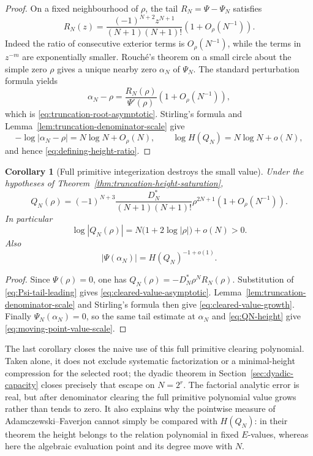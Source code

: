 \documentclass[11pt]{article}
\newtheorem{corollary}[theorem]{Corollary}
\theoremstyle{definition}
\theoremstyle{remark}
\begin{document}
\begin{proof}
On a fixed neighbourhood of $\rho$, the tail
$R_N=\Psi-\Psi_N$ satisfies
\begin{equation}\label{eq:Psi-tail-leading}
 R_N(z)=
 \frac{(-1)^{N+2}z^{N+1}}{(N+1)(N+1)!}
 \left(1+O_\rho(N^{-1})\right).
\end{equation}
Indeed the ratio of consecutive exterior terms is $O_\rho(N^{-1})$, while
the terms in $z^{-m}$ are exponentially smaller.  Rouch\'e's theorem on a
small circle about the simple zero $\rho$ gives a unique nearby zero
$\alpha_N$ of $\Psi_N$.  The standard perturbation formula yields
\[
 \alpha_N-\rho
 =\frac{R_N(\rho)}{\Psi'(\rho)}
  \left(1+O_\rho(N^{-1})\right),
\]
which is \eqref{eq:truncation-root-asymptotic}.  Stirling's formula and
Lemma~\ref{lem:truncation-denominator-scale} give
\[
 -\log|\alpha_N-\rho|=N\log N+O_\rho(N),
 \qquad
 \log H(Q_N)=N\log N+o(N),
\]
and hence \eqref{eq:defining-height-ratio}.
\end{proof}

\begin{corollary}[Full primitive integerization destroys the small value]
\label{cor:integerized-truncation-growth}
Under the hypotheses of
Theorem~\ref{thm:truncation-height-saturation},
\begin{equation}\label{eq:cleared-value-asymptotic}
 \boxed{
 Q_N(\rho)=
 (-1)^{N+3}\frac{D_N^*}{(N+1)(N+1)!}\rho^{2N+1}
 \left(1+O_\rho(N^{-1})\right).}
\end{equation}
In particular
\begin{equation}\label{eq:cleared-value-growth}
 \log|Q_N(\rho)|
 =N\bigl(1+2\log|\rho|\bigr)+o(N)>0.
\end{equation}
Also
\begin{equation}\label{eq:moving-point-value-scale}
 |\Psi(\alpha_N)|=H(Q_N)^{-1+o(1)}.
\end{equation}
\end{corollary}

\begin{proof}
Since $\Psi(\rho)=0$, one has
$Q_N(\rho)=-D_N^*\rho^N R_N(\rho)$.  Substitution of
\eqref{eq:Psi-tail-leading} gives \eqref{eq:cleared-value-asymptotic}.
Lemma~\ref{lem:truncation-denominator-scale} and Stirling's formula then
give \eqref{eq:cleared-value-growth}.  Finally
$\Psi_N(\alpha_N)=0$, so the same tail estimate at $\alpha_N$ and
\eqref{eq:QN-height} give \eqref{eq:moving-point-value-scale}.
\end{proof}

The last corollary closes the naive use of this full primitive clearing
polynomial.  Taken alone, it does not exclude systematic factorization or a
minimal-height compression for the selected root; the dyadic theorem in
Section~\ref{sec:dyadic-capacity} closes precisely that escape on
\(N=2^r\).  The factorial analytic
error is real, but after denominator clearing the full primitive polynomial
value grows rather than tends to zero.  It also explains
why the pointwise measure of Adamczewski--Faverjon cannot simply be compared
with $H(Q_N)$: in their theorem the height belongs to the relation
polynomial in fixed $E$-values, whereas here the algebraic evaluation point
and its degree move with $N$.
\end{document}
